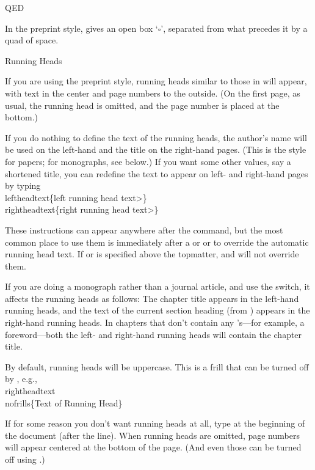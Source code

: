 \subhead QED \endsubhead

In the preprint style,  gives an open box `$\square$',
separated from what precedes it by a quad of space.


\subhead Running Heads \endsubhead

If you are using the preprint style, running heads similar to those in
\Joy{} will appear, with text in the center and page numbers to the
outside.  (On the first page, as usual, the running head is omitted, and
the page number is placed at the bottom.)

If you do nothing to define the text of the running heads, the author's
name will be used on the left-hand and the title on the right-hand pages.
(This is the style for papers; for monographs, see below.)
If you want some other values, say a shortened title, you
can redefine the text to appear on left- and right-hand pages by typing
\beginexample{}
\\leftheadtext\{\<left running head text>\}
\\rightheadtext\{\<right running head text>\}
\endexample

\noindent These instructions can appear anywhere after the
 command, but the most
common place to use them is immediately after a  or
 or  to override the automatic running head text. 
If  or  is specified above the
topmatter,  and  will not override them.

If you are doing a monograph rather than a journal article, and use
the  switch, it affects the running heads as follows:
The chapter title appears in the left-hand running heads, and the text of
the current section heading (from ) appears in the right-hand
running heads.  In chapters that don't contain any 's---for
example, a foreword---both the left- and right-hand running heads
will contain the chapter title.

By default, running heads will be uppercase.  This is a frill that
can be turned off by , e.g.,
\beginexample{}
\\rightheadtext\\nofrills\{Text of Running Head\}
\endexample

If for some reason you don't want running heads at all, type
 at the beginning of the document (after the
 line).  When running heads are omitted, page numbers
will appear centered at the bottom of the page.  (And even those can be
turned off using .)

